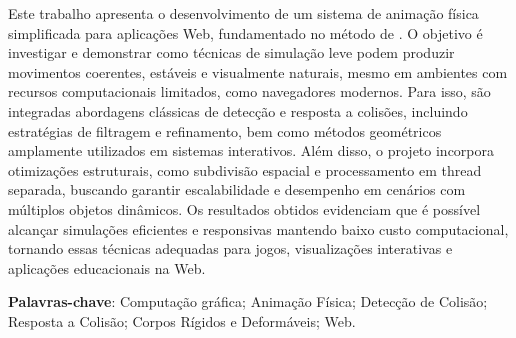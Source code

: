 \begin{resumo}
	\begin{SingleSpace}
		Este trabalho apresenta o desenvolvimento de um sistema de animação física simplificada para aplicações Web, fundamentado no método de . O objetivo é investigar e demonstrar como técnicas de simulação leve podem produzir movimentos coerentes, estáveis e visualmente naturais, mesmo em ambientes com recursos computacionais limitados, como navegadores modernos. Para isso, são integradas abordagens clássicas de detecção e resposta a colisões, incluindo estratégias de filtragem e refinamento, bem como métodos geométricos amplamente utilizados em sistemas interativos. Além disso, o projeto incorpora otimizações estruturais, como subdivisão espacial e processamento em thread separada, buscando garantir escalabilidade e desempenho em cenários com múltiplos objetos dinâmicos. Os resultados obtidos evidenciam que é possível alcançar simulações eficientes e responsivas mantendo baixo custo computacional, tornando essas técnicas adequadas para jogos, visualizações interativas e aplicações educacionais na Web.
	\end{SingleSpace}
	\vspace{\onelineskip}
	\textbf{Palavras-chave}: Computação gráfica; Animação Física; Detecção de Colisão; Resposta a Colisão; Corpos Rígidos e Deformáveis; Web.
\end{resumo}



